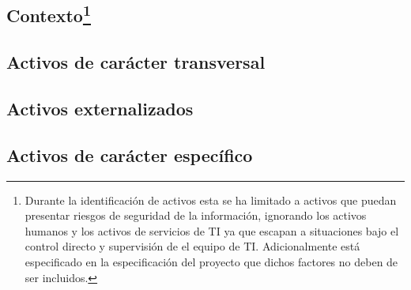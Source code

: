 \subsection{Contexto\footnote{
    Durante la identificación de activos esta se ha limitado a activos que puedan presentar riesgos de seguridad de la información, ignorando los activos humanos y los activos de servicios de TI ya que escapan a situaciones bajo el control directo y supervisión de el equipo de TI. Adicionalmente está especificado en la especificación del proyecto que dichos factores no deben de ser incluidos.}}
    



\subsection{Activos de carácter transversal}


\subsection{Activos externalizados}


\subsection{Activos de carácter específico}

